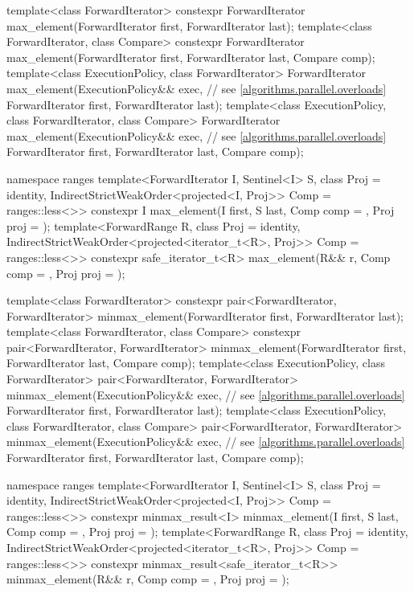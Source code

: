 \begin{codeblock}
{  template<class ForwardIterator>
    constexpr ForwardIterator max_element(ForwardIterator first, ForwardIterator last);
  template<class ForwardIterator, class Compare>
    constexpr ForwardIterator max_element(ForwardIterator first, ForwardIterator last,
                                          Compare comp);
  template<class ExecutionPolicy, class ForwardIterator>
    ForwardIterator max_element(ExecutionPolicy&& exec, // see \ref{algorithms.parallel.overloads}
                                ForwardIterator first, ForwardIterator last);
  template<class ExecutionPolicy, class ForwardIterator, class Compare>
    ForwardIterator max_element(ExecutionPolicy&& exec, // see \ref{algorithms.parallel.overloads}
                                ForwardIterator first, ForwardIterator last,
                                Compare comp);

 namespace ranges {
    template<ForwardIterator I, Sentinel<I> S, class Proj = identity,
        IndirectStrictWeakOrder<projected<I, Proj>> Comp = ranges::less<>>
      constexpr I max_element(I first, S last, Comp comp = {}, Proj proj = {});
    template<ForwardRange R, class Proj = identity,
        IndirectStrictWeakOrder<projected<iterator_t<R>, Proj>> Comp = ranges::less<>>
      constexpr safe_iterator_t<R>
        max_element(R&& r, Comp comp = {}, Proj proj = {});
  }

  template<class ForwardIterator>
    constexpr pair<ForwardIterator, ForwardIterator>
      minmax_element(ForwardIterator first, ForwardIterator last);
  template<class ForwardIterator, class Compare>
    constexpr pair<ForwardIterator, ForwardIterator>
      minmax_element(ForwardIterator first, ForwardIterator last, Compare comp);
  template<class ExecutionPolicy, class ForwardIterator>
    pair<ForwardIterator, ForwardIterator>
      minmax_element(ExecutionPolicy&& exec, // see \ref{algorithms.parallel.overloads}
                     ForwardIterator first, ForwardIterator last);
  template<class ExecutionPolicy, class ForwardIterator, class Compare>
    pair<ForwardIterator, ForwardIterator>
      minmax_element(ExecutionPolicy&& exec, // see \ref{algorithms.parallel.overloads}
                     ForwardIterator first, ForwardIterator last, Compare comp);

  namespace ranges {
    template<ForwardIterator I, Sentinel<I> S, class Proj = identity,
        IndirectStrictWeakOrder<projected<I, Proj>> Comp = ranges::less<>>
      constexpr minmax_result<I>
        minmax_element(I first, S last, Comp comp = {}, Proj proj = {});
    template<ForwardRange R, class Proj = identity,
        IndirectStrictWeakOrder<projected<iterator_t<R>, Proj>> Comp = ranges::less<>>
      constexpr minmax_result<safe_iterator_t<R>>
        minmax_element(R&& r, Comp comp = {}, Proj proj = {});
  }

}
\end{codeblock}
